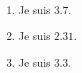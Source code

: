     \ \\ [-5mm]
    \begin{enumerate}
      \item Je suis $\num{3.7}$.
      \item Je suis $\num{2.31}$.
      \item Je suis $\num{3.3}$.
   \end{enumerate}
